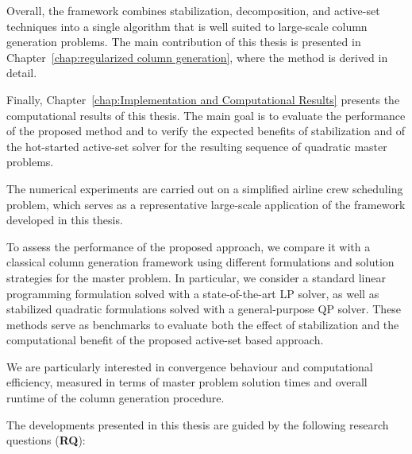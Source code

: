 \documentclass{book}
\theoremstyle{definition}
\newcounter{algorithm_}
\numberwithin{algorithm_}{chapter}
\begin{document}
Overall, the framework combines stabilization, decomposition, and active-set techniques into a single algorithm that is well suited to large-scale column generation problems. 
The main contribution of this thesis is presented in Chapter~\ref{chap:regularized column generation}, where the method is derived in detail.

\bigskip

Finally, Chapter~\ref{chap:Implementation and Computational Results} presents the computational results of this thesis. The main goal is to evaluate the performance of the proposed method and to verify the expected benefits of stabilization and of the hot-started active-set solver for the resulting sequence of quadratic master problems.

The numerical experiments are carried out on a simplified airline crew scheduling problem, which serves as a representative large-scale application of the framework developed in this thesis.

To assess the performance of the proposed approach, we compare it with a classical column generation framework using different formulations and solution strategies for the master problem. 
In particular, we consider a standard linear programming formulation solved with a state-of-the-art LP solver, as well as stabilized quadratic formulations solved with a general-purpose QP solver. 
These methods serve as benchmarks to evaluate both the effect of stabilization and the computational benefit of the proposed active-set based approach.

We are particularly interested in convergence behaviour and computational efficiency, measured in terms of master problem solution times and overall runtime of the column generation procedure.

\bigskip

The developments presented in this thesis are guided by the following research questions (\textbf{RQ}):
\end{document}

